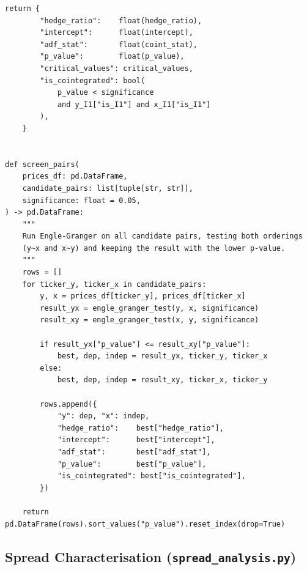 \documentclass[a4paper]{report}
\begin{document}
\begin{Verbatim}[fontsize=\footnotesize, baselinestretch=0.85]
    return {
        "hedge_ratio":    float(hedge_ratio),
        "intercept":      float(intercept),
        "adf_stat":       float(coint_stat),
        "p_value":        float(p_value),
        "critical_values": critical_values,
        "is_cointegrated": bool(
            p_value < significance
            and y_I1["is_I1"] and x_I1["is_I1"]
        ),
    }


def screen_pairs(
    prices_df: pd.DataFrame,
    candidate_pairs: list[tuple[str, str]],
    significance: float = 0.05,
) -> pd.DataFrame:
    """
    Run Engle-Granger on all candidate pairs, testing both orderings
    (y~x and x~y) and keeping the result with the lower p-value.
    """
    rows = []
    for ticker_y, ticker_x in candidate_pairs:
        y, x = prices_df[ticker_y], prices_df[ticker_x]
        result_yx = engle_granger_test(y, x, significance)
        result_xy = engle_granger_test(x, y, significance)

        if result_yx["p_value"] <= result_xy["p_value"]:
            best, dep, indep = result_yx, ticker_y, ticker_x
        else:
            best, dep, indep = result_xy, ticker_x, ticker_y

        rows.append({
            "y": dep, "x": indep,
            "hedge_ratio":    best["hedge_ratio"],
            "intercept":      best["intercept"],
            "adf_stat":       best["adf_stat"],
            "p_value":        best["p_value"],
            "is_cointegrated": best["is_cointegrated"],
        })

    return pd.DataFrame(rows).sort_values("p_value").reset_index(drop=True)
\end{Verbatim}

\subsection{Spread Characterisation (\texttt{spread\_analysis.py})}
\end{document}
